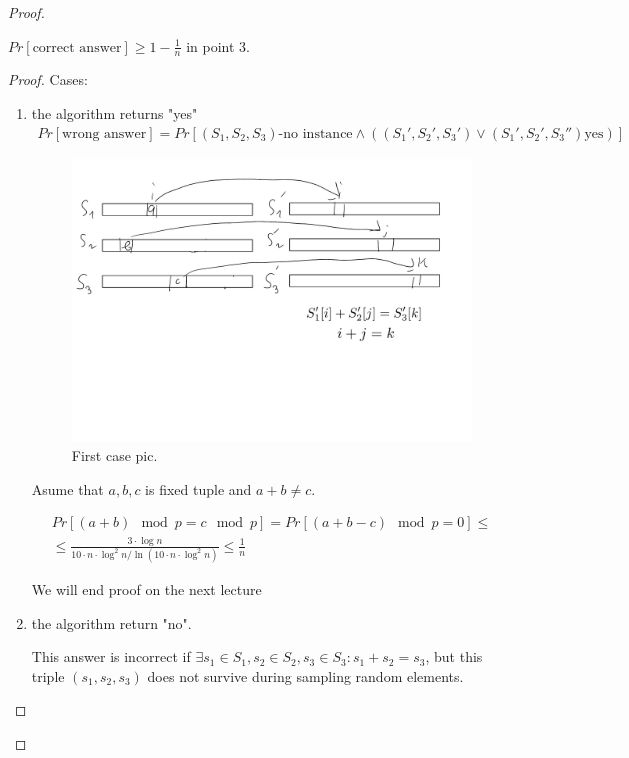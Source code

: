 \begin{proof}
  \begin{thm}
	$Pr[\text{correct answer}] \geq 1 - \frac{1}{n}$ in point 3.
  \end{thm}
  \begin{proof}

	Cases:
	\begin{enumerate}
	  \item the algorithm returns "yes"
		\begin{align*}
		  Pr[\text{wrong answer}] = Pr[(S_1, S_2, S_3) \text{-no instance} \land ((S_1', S_2', S_3') \lor (S_1', S_2', S_3'') \text{yes}) ]
		\end{align*}
		\begin{figure}[ht]
		  \center
		  \includegraphics[scale=0.3]{figures/3.pdf}
		  \caption{First case pic.}
		\end{figure}


		Asume that $a, b, c$ is fixed tuple and $a + b \neq c$.

		\begin{align*}
		  Pr[(a + b) \mod p = c \mod p] = Pr[(a + b - c) \mod p = 0] \leq \\
		  \leq \frac{3 \cdot \log n}{10 \cdot n \cdot \log^2 n / \ln(10 \cdot n \cdot \log^2 n)} \leq \frac{1}{n}
		\end{align*}

		{\color{red} We will end proof on the next lecture}

	  \item the algorithm return "no".

		This answer is incorrect if $\exists s_1 \in S_1, s_2 \in S_2, s_3 \in S_3 : s_1 + s_2 = s_3$, but this triple $(s_1, s_2, s_3)$ does not survive during sampling random elements.


\end{enumerate}
\end{proof}
\end{proof}
